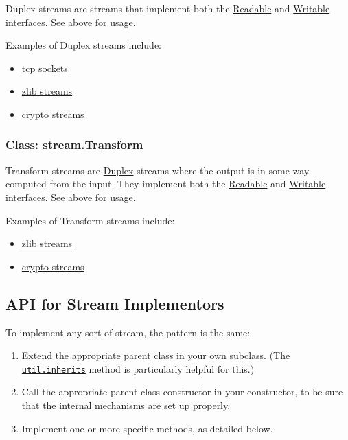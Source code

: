 Duplex streams are streams that implement both the
\hyperref[streamux5fclassux5fstreamux5freadable]{Readable} and
\hyperref[streamux5fclassux5fstreamux5fwritable]{Writable} interfaces.
See above for usage.

Examples of Duplex streams include:

\begin{itemize}
\itemsep1pt\parskip0pt
\item
  \href{net.html\#net_class_net_socket}{tcp sockets}
\item
  \href{zlib.html}{zlib streams}
\item
  \href{crypto.html}{crypto streams}
\end{itemize}

\subsubsection{Class: stream.Transform}\label{class-stream.transform}

Transform streams are
\hyperref[streamux5fclassux5fstreamux5fduplex]{Duplex} streams where the
output is in some way computed from the input. They implement both the
\hyperref[streamux5fclassux5fstreamux5freadable]{Readable} and
\hyperref[streamux5fclassux5fstreamux5fwritable]{Writable} interfaces.
See above for usage.

Examples of Transform streams include:

\begin{itemize}
\itemsep1pt\parskip0pt
\item
  \href{zlib.html}{zlib streams}
\item
  \href{crypto.html}{crypto streams}
\end{itemize}

\subsection{API for Stream
Implementors}\label{api-for-stream-implementors}

To implement any sort of stream, the pattern is the same:

\begin{enumerate}
\def\labelenumi{\arabic{enumi}.}
\itemsep1pt\parskip0pt
\item
  Extend the appropriate parent class in your own subclass. (The
  \href{util.html\#util_util_inherits_constructor_superconstructor}{\texttt{util.inherits}}
  method is particularly helpful for this.)
\item
  Call the appropriate parent class constructor in your constructor, to
  be sure that the internal mechanisms are set up properly.
\item
  Implement one or more specific methods, as detailed below.
\end{enumerate}

